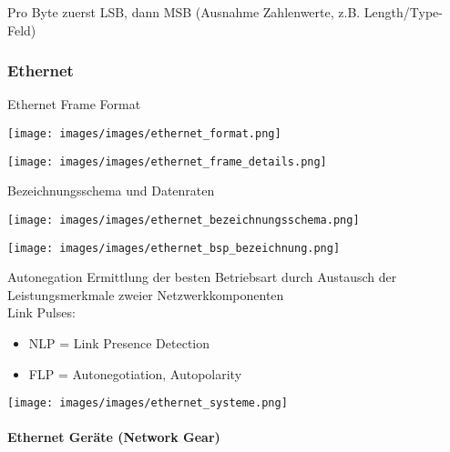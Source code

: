 \begin{remark}
    Pro Byte zuerst LSB, dann MSB (Ausnahme Zahlenwerte, z.B. Length/Type-Feld)
\end{remark}

\subsubsection*{Ethernet}

\begin{definition}{Ethernet Frame Format}\\
    \begin{minipage}{0.3\linewidth}
        \texttt{[image: images/images/ethernet\_format.png]}
    \end{minipage}
    \begin{minipage}{0.7\linewidth}
        \texttt{[image: images/images/ethernet\_frame\_details.png]}
    \end{minipage}     
\end{definition}

\begin{theorem}{Bezeichnungsschema und Datenraten}\\
    \begin{minipage}{0.65\linewidth}
        \texttt{[image: images/images/ethernet\_bezeichnungsschema.png]}
    \end{minipage}
    \begin{minipage}{0.3\linewidth}
        \texttt{[image: images/images/ethernet\_bsp\_bezeichnung.png]}
    \end{minipage}
\end{theorem}

\begin{concept}{Autonegation}
    Ermittlung der besten Betriebsart durch Austausch der Leistungsmerkmale zweier Netzwerkkomponenten\\
    Link Pulses:
    \begin{itemize}
        \item NLP = Link Presence Detection
        \item FLP = Autonegotiation, Autopolarity
    \end{itemize}
        \texttt{[image: images/images/ethernet\_systeme.png]}
\end{concept}


\paragraph{Ethernet Geräte (Network Gear)}

